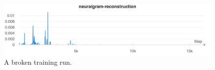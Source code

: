 \documentclass[12pt]{article}
\renewcommand{\baselinestretch}{1.5}
\begin{document}
\begin{figure}
\begin{center}
  \includegraphics[width=\textwidth]{assets/figures/broken-nr}
\end{center}
\caption{A broken training run.}
\label{fig:broken-nr}
\end{figure}





\newpage
\renewcommand{\baselinestretch}{1}
\end{document}
